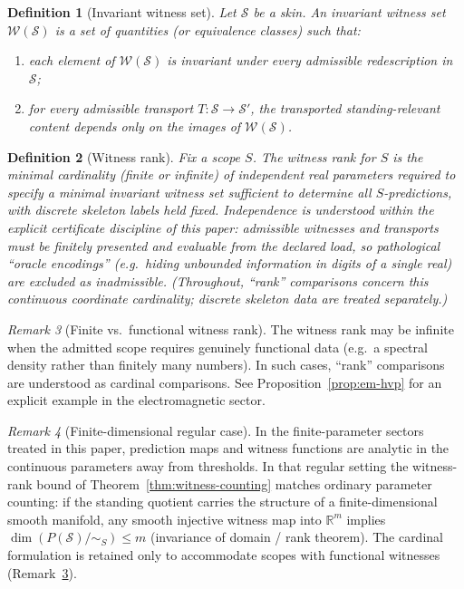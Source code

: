 \documentclass[11pt]{article}
\newtheorem{definition}{Definition}[section]
\theoremstyle{remark}
\newtheorem{remark}[definition]{Remark}
\newcommand{\Skin}{\mathcal{S}}
\newcommand{\Wit}{\mathcal{W}}
\begin{document}
\begin{definition}[Invariant witness set]\label{def:witness}
Let $\Skin$ be a skin. An \emph{invariant witness set} $\Wit(\Skin)$ is a set of quantities
(or equivalence classes) such that:
\begin{enumerate}[label=(\roman*),leftmargin=2.2em]
\item each element of $\Wit(\Skin)$ is invariant under every admissible redescription in $\Skin$;
\item for every admissible transport $T:\Skin\to\Skin'$, the transported standing-relevant content depends
only on the images of $\Wit(\Skin)$.
\end{enumerate}
\end{definition}

\begin{definition}[Witness rank]\label{def:witness-rank}
Fix a scope $S$.
The \emph{witness rank} for $S$ is the minimal \emph{cardinality} (finite or infinite) of independent real
parameters required to specify a minimal invariant witness set sufficient to determine all $S$-predictions,
with discrete skeleton labels held fixed.
Independence is understood within the explicit certificate discipline of this paper: admissible witnesses and
transports must be finitely presented and evaluable from the declared load, so pathological ``oracle encodings''
(e.g.\ hiding unbounded information in digits of a single real) are excluded as inadmissible.
(Throughout, ``rank'' comparisons concern this continuous coordinate cardinality; discrete skeleton data are
treated separately.)
\end{definition}

\begin{remark}[Finite vs.\ functional witness rank]\label{rem:witness-rank-functional}
The witness rank may be infinite when the admitted scope requires genuinely functional data (e.g.\ a spectral
density rather than finitely many numbers). In such cases, ``rank'' comparisons are understood as cardinal
comparisons. See Proposition~\ref{prop:em-hvp} for an explicit example in the electromagnetic sector.
\end{remark}

\begin{remark}[Finite-dimensional regular case]\label{rem:witness-rank-regular}
In the finite-parameter sectors treated in this paper, prediction maps and witness functions are analytic in the
continuous parameters away from thresholds. In that regular setting the witness-rank bound of
Theorem~\ref{thm:witness-counting} matches ordinary parameter counting: if the standing quotient carries the structure
of a finite-dimensional smooth manifold, any smooth injective witness map into $\mathbb{R}^m$ implies
$\dim\!\left(P(\Skin)/\!\sim_S\right)\le m$ (invariance of domain / rank theorem). The cardinal formulation is retained
only to accommodate scopes with functional witnesses (Remark~\ref{rem:witness-rank-functional}).
\end{remark}
\end{document}
